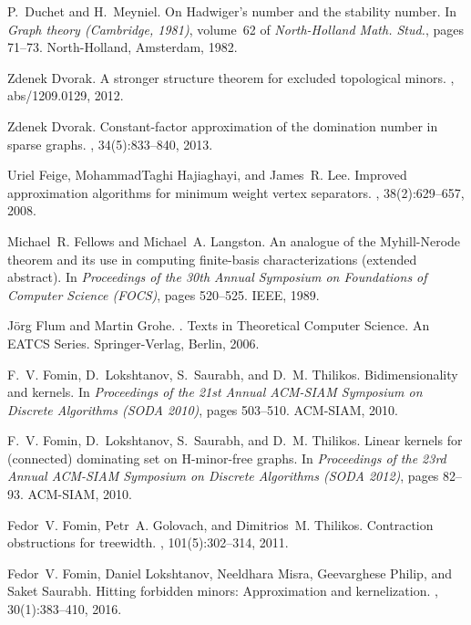 \documentclass[11pt]{article}
\begin{document}
\begin{thebibliography}{10}
P.~Duchet and H.~Meyniel.
\newblock On {H}adwiger's number and the stability number.
\newblock In {\em Graph theory ({C}ambridge, 1981)}, volume~62 of {\em
  North-Holland Math. Stud.}, pages 71--73. North-Holland, Amsterdam, 1982.

Zdenek Dvorak.
\newblock A stronger structure theorem for excluded topological minors.
, abs/1209.0129, 2012.

Zdenek Dvorak.
\newblock Constant-factor approximation of the domination number in sparse
  graphs.
, 34(5):833--840, 2013.

Uriel Feige, MohammadTaghi Hajiaghayi, and James~R. Lee.
\newblock Improved approximation algorithms for minimum weight vertex
  separators.
, 38(2):629--657, 2008.

Michael~R. Fellows and Michael~A. Langston.
\newblock An analogue of the {M}yhill-{N}erode theorem and its use in computing
  finite-basis characterizations (extended abstract).
\newblock In {\em Proceedings of the 30th Annual Symposium on Foundations of
  Computer Science (FOCS)}, pages 520--525. IEEE, 1989.

J{\"o}rg Flum and Martin Grohe.
.
\newblock Texts in Theoretical Computer Science. An EATCS Series.
  Springer-Verlag, Berlin, 2006.

F.~V. Fomin, D.~Lokshtanov, S.~Saurabh, and D.~M. Thilikos.
\newblock Bidimensionality and kernels.
\newblock In {\em Proceedings of the 21st Annual ACM-SIAM Symposium on Discrete
  Algorithms (SODA 2010)}, pages 503--510. ACM-SIAM, 2010.

F.~V. Fomin, D.~Lokshtanov, S.~Saurabh, and D.~M. Thilikos.
\newblock Linear kernels for (connected) dominating set on {H}-minor-free
  graphs.
\newblock In {\em Proceedings of the 23rd Annual ACM-SIAM Symposium on Discrete
  Algorithms (SODA 2012)}, pages 82--93. ACM-SIAM, 2010.

Fedor~V. Fomin, Petr~A. Golovach, and Dimitrios~M. Thilikos.
\newblock Contraction obstructions for treewidth.
, 101(5):302--314, 2011.

Fedor~V. Fomin, Daniel Lokshtanov, Neeldhara Misra, Geevarghese Philip, and
  Saket Saurabh.
\newblock Hitting forbidden minors: Approximation and kernelization.
, 30(1):383--410, 2016.


\end{thebibliography}
\end{document}
